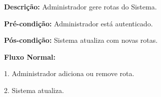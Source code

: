 \textbf{Descrição:} Administrador gere rotas do Sistema.

\textbf{Pré-condição:} Administrador está autenticado.

\textbf{Pós-condição:} Sistema atualiza com novas rotas.

\textbf{Fluxo Normal:}

1. Administrador adiciona ou remove rota.

2. Sistema atualiza.